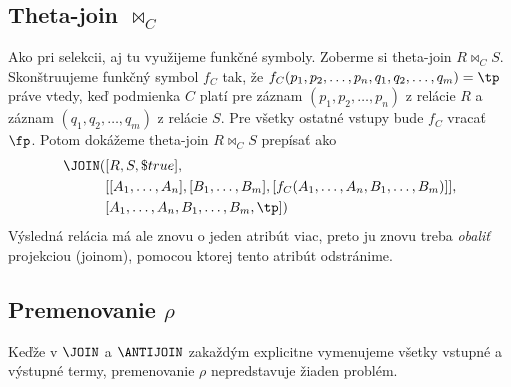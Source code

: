 \subsection*{Theta-join $\Join_C$}
Ako pri selekcii, aj tu využijeme funkčné symboly. Zoberme si theta-join $R \Join_C S$.
Skonštruujeme funkčný symbol $f_C$ tak, že $f_C(p_1, p_2, \dots, p_n, q_1, q_2, \dots, q_m) = \tp$
práve vtedy, keď podmienka $C$ platí pre záznam $(p_1, p_2, \dots, p_n)$ z relácie $R$ a záznam
$(q_1, q_2, \dots, q_m)$ z relácie $S$. Pre všetky ostatné vstupy bude $f_C$ vracať $\fp$. Potom
dokážeme theta-join $R \Join_C S$ prepísať ako
\begin{align*}
    \JOIN(&[R, S, \$true], \\
          &[[A_1, \dots, A_n], [B_1, \dots, B_m], [f_C(A_1, \dots, A_n, B_1, \dots, B_m)]], \\
          &[A_1, \dots, A_n, B_1, \dots, B_m, \tp])
\end{align*}
Výsledná relácia má ale znovu o jeden atribút viac, preto ju znovu treba \textit{obaliť} projekciou
(joinom), pomocou ktorej tento atribút odstránime.

\subsection*{Premenovanie $\rho$}
Keďže v $\JOIN$ a $\ANTIJOIN$ zakaždým explicitne vymenujeme všetky vstupné a výstupné termy,
premenovanie $\rho$ nepredstavuje žiaden problém.
